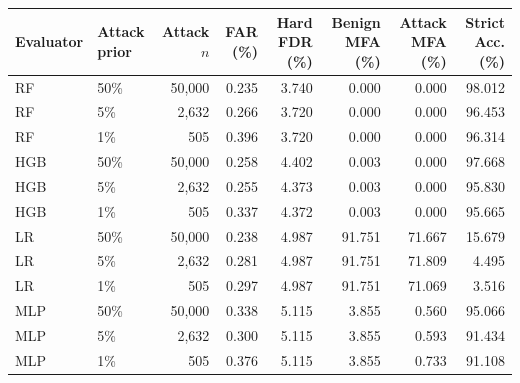 \begin{suppnonfloattable}
\centering
\caption{Previously constructed row-disjoint NF-ToN-IoT-v2 static holdout under class-prior stress. Ten fixed training seeds; means across seeds. Thresholds were frozen on validation before scoring the new holdout. The 95/5 and 99/1 rows retain 50,000 benign flows and resample attack flows under a pure-prior-shift assumption. FAR is direct attack Allow; hard FDR is benign Deny; MFA rates are class conditional; strict accuracy credits benign Allow and attack Deny only. These flow-label proxies do not measure authentication completion, switch rate, or temporal cost.}
\label{tab:supp_nf_static}
\scriptsize
\setlength{\tabcolsep}{3.5pt}
\begin{tabular}{llrrrrrr}
\toprule
Evaluator & Attack prior & Attack $n$ & FAR (\%) & Hard FDR (\%) & Benign MFA (\%) & Attack MFA (\%) & Strict Acc. (\%) \\
\midrule
RF & 50\% & 50,000 & 0.235 & 3.740 & 0.000 & 0.000 & 98.012 \\
RF & 5\% & 2,632 & 0.266 & 3.720 & 0.000 & 0.000 & 96.453 \\
RF & 1\% & 505 & 0.396 & 3.720 & 0.000 & 0.000 & 96.314 \\
HGB & 50\% & 50,000 & 0.258 & 4.402 & 0.003 & 0.000 & 97.668 \\
HGB & 5\% & 2,632 & 0.255 & 4.373 & 0.003 & 0.000 & 95.830 \\
HGB & 1\% & 505 & 0.337 & 4.372 & 0.003 & 0.000 & 95.665 \\
LR & 50\% & 50,000 & 0.238 & 4.987 & 91.751 & 71.667 & 15.679 \\
LR & 5\% & 2,632 & 0.281 & 4.987 & 91.751 & 71.809 & 4.495 \\
LR & 1\% & 505 & 0.297 & 4.987 & 91.751 & 71.069 & 3.516 \\
MLP & 50\% & 50,000 & 0.338 & 5.115 & 3.855 & 0.560 & 95.066 \\
MLP & 5\% & 2,632 & 0.300 & 5.115 & 3.855 & 0.593 & 91.434 \\
MLP & 1\% & 505 & 0.376 & 5.115 & 3.855 & 0.733 & 91.108 \\
\bottomrule
\end{tabular}
\end{suppnonfloattable}
